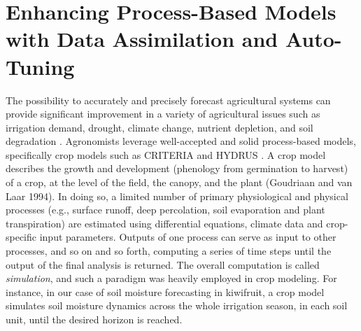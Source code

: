 \chapter{Enhancing Process-Based Models with Data Assimilation and Auto-Tuning}
\label{physics-aware-chap:orchard}

The possibility to accurately and precisely forecast agricultural systems can provide significant improvement in a variety of agricultural issues such as irrigation demand, drought, climate change, nutrient depletion, and soil degradation \cite{vitali2021crop}.
Agronomists leverage well-accepted and solid process-based models, specifically crop models such as CRITERIA \cite{Bittelli2011253} and HYDRUS \cite{hydrus2008587}.
A crop model describes the growth and development (phenology from germination to harvest) of a crop, at the level of the field, the canopy, and the plant (Goudriaan and van Laar 1994).
In doing so, a limited number of primary physiological and physical processes (e.g., surface runoff, deep percolation, soil evaporation and plant transpiration) are estimated using differential equations, climate data and crop-specific input parameters.
Outputs of one process can serve as input to other processes, and so on and so forth, computing a series of time steps until the output of the final analysis is returned.
The overall computation is called \textit{simulation}, and such a paradigm was heavily employed in crop modeling.
For instance, in our case of soil moisture forecasting in kiwifruit, a crop model simulates soil moisture dynamics across the whole irrigation season, in each soil unit, until the desired horizon is reached.

